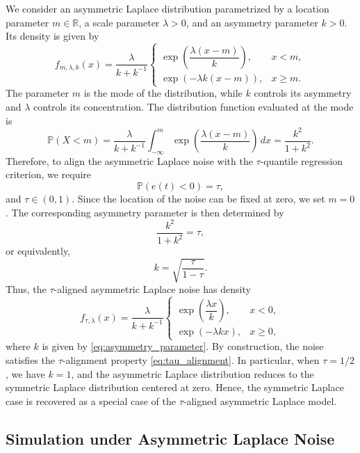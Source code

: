 \documentclass[12pt,a4paper]{article}
\begin{document}
We consider an asymmetric Laplace distribution parametrized by a location parameter
$m\in\mathbb{R}$, a scale parameter $\lambda>0$, and an asymmetry parameter
$k>0$. Its density is given by
\[
f_{m,\lambda,k}(x)
=
\frac{\lambda}{k+k^{-1}}
\begin{cases}
	\exp\left(\dfrac{\lambda(x-m)}{k}\right), & x<m, \\[8pt]
	\exp\left(-\lambda k(x-m)\right), & x\geq m.
\end{cases}
\]
The parameter $m$ is the mode of the distribution, while $k$ controls its
asymmetry and $\lambda$ controls its concentration.
The distribution function evaluated at the mode is
\[
\mathbb{P}(X<m)
=
\frac{\lambda}{k+k^{-1}}
\int_{-\infty}^{m}
\exp\left(\frac{\lambda(x-m)}{k}\right)\,dx
=
\frac{k^2}{1+k^2}.
\]
Therefore, to align the asymmetric Laplace noise with the $\tau$-quantile
regression criterion, we require
\begin{equation}
	\mathbb{P}(e(t)<0)=\tau,
	\label{eq:tau_alignment}
\end{equation}
and
\(
\tau\in(0,1).
\)
Since the location of the noise can be fixed at zero, we set $m=0$. The
corresponding asymmetry parameter is then determined by
\[
\frac{k^2}{1+k^2}=\tau,
\]
or equivalently,
\begin{equation}
	k
	=
	\sqrt{\frac{\tau}{1-\tau}}.
	\label{eq:asymmetry_parameter}
\end{equation}
Thus, the $\tau$-aligned asymmetric Laplace noise has density
\[
f_{\tau,\lambda}(x)
=
\frac{\lambda}{k+k^{-1}}
\begin{cases}
	\exp\left(\dfrac{\lambda x}{k}\right), & x<0, \\[8pt]
	\exp(-\lambda kx), & x\geq 0,
\end{cases}
\]
where $k$ is given by \eqref{eq:asymmetry_parameter}. 
By construction, the noise satisfies the $\tau$-alignment property
\eqref{eq:tau_alignment}.
In particular, when $\tau=1/2$, we have $k=1$, and the asymmetric Laplace
distribution reduces to the symmetric Laplace distribution centered at zero.
Hence, the symmetric Laplace case is recovered as a special case of the
$\tau$-aligned asymmetric Laplace model.

\subsection{Simulation under Asymmetric Laplace Noise}
\label{subsec:asymmetric_laplace_noise}
\end{document}
